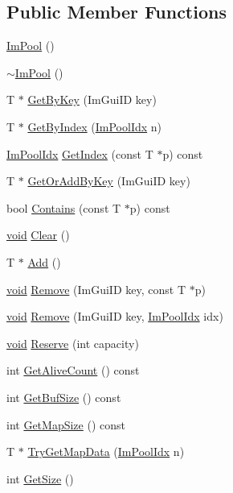 \subsection*{Public Member Functions}
\begin{DoxyCompactItemize}
\item 
\hyperlink{structImPool_a8377750adcef3c1b858b6271bc6ecff8}{Im\+Pool} ()
\item 
\hyperlink{structImPool_aa0b55e4483e95d6723d51b5106de4bc2}{$\sim$\+Im\+Pool} ()
\item 
T $\ast$ \hyperlink{structImPool_ae287bf93e178ecacead30a8baea62877}{Get\+By\+Key} (Im\+Gui\+ID key)
\item 
T $\ast$ \hyperlink{structImPool_a9f46e2f38f1a02bef31899eeb1f3fdec}{Get\+By\+Index} (\hyperlink{imgui__internal_8h_a2bcd38f7be434db57a9757ebf7aa56d0}{Im\+Pool\+Idx} n)
\item 
\hyperlink{imgui__internal_8h_a2bcd38f7be434db57a9757ebf7aa56d0}{Im\+Pool\+Idx} \hyperlink{structImPool_a3e683876ebd44c7f6f098851ee522870}{Get\+Index} (const T $\ast$p) const
\item 
T $\ast$ \hyperlink{structImPool_a564fd757c33978601849a6091dcd99a0}{Get\+Or\+Add\+By\+Key} (Im\+Gui\+ID key)
\item 
bool \hyperlink{structImPool_a2434a4efa2eab4aeca8e15ac208c18d8}{Contains} (const T $\ast$p) const
\item 
\hyperlink{imgui__impl__opengl3__loader_8h_ac668e7cffd9e2e9cfee428b9b2f34fa7}{void} \hyperlink{structImPool_a613b0fa43ad7457ebde2988d4ea5f0be}{Clear} ()
\item 
T $\ast$ \hyperlink{structImPool_a10328df7e17eb5ab4b91c25ad3b0db4f}{Add} ()
\item 
\hyperlink{imgui__impl__opengl3__loader_8h_ac668e7cffd9e2e9cfee428b9b2f34fa7}{void} \hyperlink{structImPool_a7b2c095ea540dc8afb670e705a37a912}{Remove} (Im\+Gui\+ID key, const T $\ast$p)
\item 
\hyperlink{imgui__impl__opengl3__loader_8h_ac668e7cffd9e2e9cfee428b9b2f34fa7}{void} \hyperlink{structImPool_a967f556412946a33bca3950f9be7a6ae}{Remove} (Im\+Gui\+ID key, \hyperlink{imgui__internal_8h_a2bcd38f7be434db57a9757ebf7aa56d0}{Im\+Pool\+Idx} idx)
\item 
\hyperlink{imgui__impl__opengl3__loader_8h_ac668e7cffd9e2e9cfee428b9b2f34fa7}{void} \hyperlink{structImPool_a62a34bcb3efcaaa3f4402c0c3cc1d600}{Reserve} (int capacity)
\item 
int \hyperlink{structImPool_a3073eefd71bfd53dede8a5d62ad5e019}{Get\+Alive\+Count} () const
\item 
int \hyperlink{structImPool_a4ec15d734fead5c872ee5e309b2294af}{Get\+Buf\+Size} () const
\item 
int \hyperlink{structImPool_a519f3e31d5750c6fef15642720f68a6c}{Get\+Map\+Size} () const
\item 
T $\ast$ \hyperlink{structImPool_a55497f17d4d027e53b8689f1de5356a0}{Try\+Get\+Map\+Data} (\hyperlink{imgui__internal_8h_a2bcd38f7be434db57a9757ebf7aa56d0}{Im\+Pool\+Idx} n)
\item 
int \hyperlink{structImPool_ae71be921586613e7676b1085b5e5676f}{Get\+Size} ()
\end{DoxyCompactItemize}
